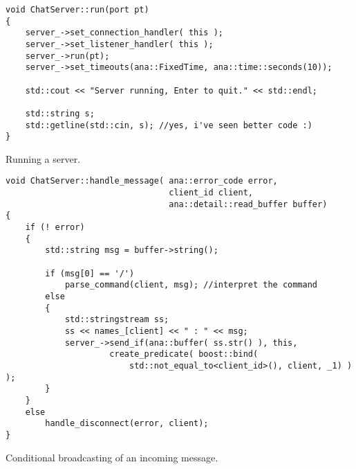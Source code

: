 \documentclass[a4paper,12pt,english]{article}
\begin{document}
\begin{table}[!htb]
\lstset{language=C++}
\begin{lstlisting}[frame=single]
void ChatServer::run(port pt)
{
    server_->set_connection_handler( this );
    server_->set_listener_handler( this );
    server_->run(pt);
    server_->set_timeouts(ana::FixedTime, ana::time::seconds(10));

    std::cout << "Server running, Enter to quit." << std::endl;

    std::string s;
    std::getline(std::cin, s); //yes, i've seen better code :)
}
\end{lstlisting}
\centering \caption{Running a server.} 
\label{server-run}
\end{table} 


\begin{table}[!htb]
\lstset{language=C++}
\begin{lstlisting}[frame=single]
void ChatServer::handle_message( ana::error_code error, 
                                 client_id client, 
                                 ana::detail::read_buffer buffer)
{
    if (! error)
    {
        std::string msg = buffer->string();

        if (msg[0] == '/')
            parse_command(client, msg); //interpret the command
        else
        {
            std::stringstream ss;
            ss << names_[client] << " : " << msg;
            server_->send_if(ana::buffer( ss.str() ), this,
                     create_predicate( boost::bind( 
                         std::not_equal_to<client_id>(), client, _1) ) );
        }
    }
    else
        handle_disconnect(error, client);
}
\end{lstlisting}
\centering \caption{Conditional broadcasting of an incoming message.} 
\label{server-message}
\end{table} 
\end{document}
